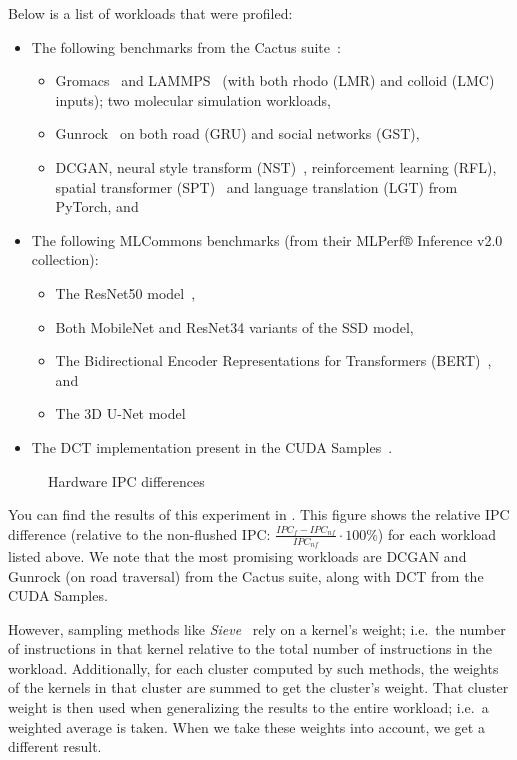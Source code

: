 \documentclass[5p,numvwe]{elsarticle}
\begin{document}
    Below is a list of workloads that were profiled:
    \begin{itemize}
        \item The following benchmarks from the Cactus suite~\cite{cactus}:
        \begin{itemize}
            \item Gromacs~\cite{gromacs} and LAMMPS~\cite{LAMMPS} (with both rhodo (LMR) and colloid (LMC) inputs); two molecular simulation workloads,
            \item Gunrock~\cite{gru} on both road (GRU) and social networks (GST),
            \item DCGAN, neural style transform (NST)~\cite{nst}, reinforcement learning (RFL), spatial transformer (SPT)~\cite{spt} and language translation (LGT) from PyTorch, and
        \end{itemize}
        \item The following MLCommons benchmarks (from their MLPerf® Inference v2.0 collection):
        \begin{itemize}
            \item The ResNet50 model~\cite{resnet50},
            \item Both MobileNet and ResNet34 variants of the SSD model,
            \item The Bidirectional Encoder Representations for Transformers (BERT)~\cite{bert}, and
            \item The 3D U-Net model~\cite{3d-unet}
        \end{itemize}
        \item The DCT implementation present in the CUDA Samples~\cite{samples}.
    \end{itemize}

    \begin{figure}[ht]
        \centering
        \caption{Hardware IPC differences}
        \label{fig:hw-ipc}
    \end{figure}

    You can find the results of this experiment in .
    This figure shows the relative IPC difference (relative to the non-flushed IPC: $\frac{IPC_f - IPC_{nf}}{IPC_{nf}} \cdot 100\%$) for each workload listed above.
    We note that the most promising workloads are DCGAN and Gunrock (on road traversal) from the Cactus suite, along with DCT from the CUDA Samples.

    However, sampling methods like \textit{Sieve}~\cite{sieve} rely on a kernel's weight; i.e.\ the number of instructions in that kernel relative to the total number of instructions in the workload.
    Additionally, for each cluster computed by such methods, the weights of the kernels in that cluster are summed to get the cluster's weight.
    That cluster weight is then used when generalizing the results to the entire workload; i.e.\ a weighted average is taken.
    When we take these weights into account, we get a different result.
\end{document}

